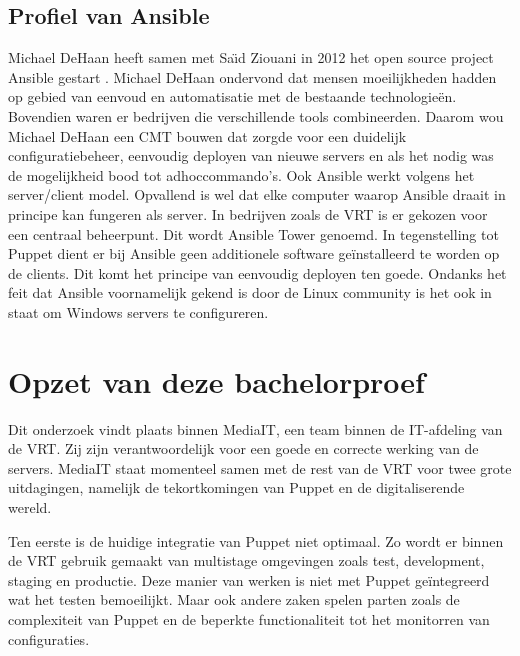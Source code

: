 \subsection{Profiel van Ansible}
Michael DeHaan heeft samen met Sa{\"\i}d Ziouani in 2012 het open source project Ansible gestart \autocite{ansiblefordevops}.  Michael DeHaan ondervond dat mensen moeilijkheden hadden op gebied van eenvoud en automatisatie met de bestaande technologie\"en. Bovendien waren er bedrijven die verschillende tools combineerden. Daarom wou Michael DeHaan een \gls{CMT} bouwen dat zorgde voor een duidelijk configuratiebeheer, eenvoudig deployen van nieuwe servers en als het nodig was de mogelijkheid bood tot \gls{adhoccommando}'s.  Ook Ansible werkt volgens het server/client model. Opvallend is wel dat elke computer waarop Ansible draait in principe kan fungeren als server. In bedrijven zoals de \gls{VRT} is er gekozen voor een centraal beheerpunt. Dit wordt Ansible Tower genoemd. In tegenstelling tot Puppet dient er bij Ansible geen additionele software ge\"installeerd te worden op de clients. Dit komt het principe van eenvoudig deployen ten goede. Ondanks het feit dat Ansible voornamelijk gekend is door de Linux community is het ook in staat om Windows servers te configureren. \autocite{ansibleforwindows}









\section{Opzet van deze bachelorproef}
\label{sec:opzet-bachelorproef}


Dit onderzoek vindt plaats binnen MediaIT, een team binnen de IT-afdeling van de \gls{VRT}. Zij zijn verantwoordelijk voor een goede en correcte werking van de servers. MediaIT staat momenteel samen met de rest van de \gls{VRT} voor twee grote uitdagingen, namelijk de tekortkomingen van Puppet en de digitaliserende wereld.

Ten eerste is de huidige integratie van Puppet niet optimaal. Zo wordt er binnen de \gls{VRT} gebruik gemaakt van multistage omgevingen zoals test, development, staging en productie. Deze manier van werken is niet met Puppet ge\"integreerd wat het testen bemoeilijkt. Maar ook andere zaken spelen parten zoals de complexiteit van Puppet en de beperkte functionaliteit tot het monitorren van configuraties.

